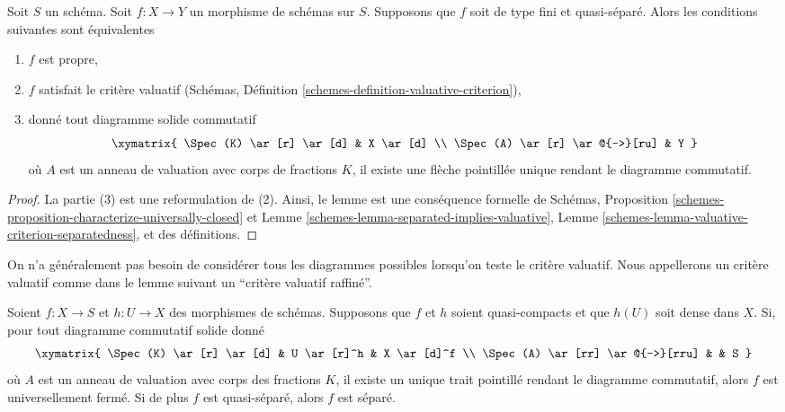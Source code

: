 \begin{lemma}
\label{lemma-characterize-proper}
\begin{reference}
\cite[II Théorème 7.3.8]{EGA}
\end{reference}
Soit $S$ un schéma. Soit $f : X \to Y$ un morphisme de schémas sur $S$.
Supposons que $f$ soit de type fini et quasi-séparé. Alors les
conditions suivantes sont équivalentes
\begin{enumerate}
\item $f$ est propre,
\item $f$ satisfait le critère
valuatif (Schémas, Définition \ref{schemes-definition-valuative-criterion}),
\item donné tout diagramme solide commutatif
$$
\xymatrix{
\Spec(K) \ar[r] \ar[d] & X \ar[d] \\
\Spec(A) \ar[r] \ar@{-->}[ru] & Y
}
$$
où $A$ est un anneau de valuation avec corps de fractions $K$, il existe une
flèche pointillée unique rendant le diagramme commutatif.
\end{enumerate}
\end{lemma}

\begin{proof}
La partie (3) est une reformulation de
(2). Ainsi,
le lemme est une conséquence formelle de Schémas,
Proposition \ref{schemes-proposition-characterize-universally-closed} et Lemme
\ref{schemes-lemma-separated-implies-valuative}, Lemme \ref{schemes-lemma-valuative-criterion-separatedness}, et des
définitions.
\end{proof}

\noindent
On n'a généralement pas besoin de considérer tous les diagrammes possibles
lorsqu'on teste le critère valuatif. Nous appellerons un critère valuatif
comme dans le lemme suivant un ``critère valuatif raffiné''.

\begin{lemma}
\label{lemma-refined-valuative-criterion-universally-closed}
Soient $f : X \to S$ et $h : U \to X$ des morphismes de schémas. Supposons que $f$
et $h$ soient quasi-compacts et que $h(U)$ soit dense dans $X$. Si,
pour tout diagramme commutatif solide donné
$$
\xymatrix{
\Spec(K) \ar[r] \ar[d] & U \ar[r]^h & X \ar[d]^f \\
\Spec(A) \ar[rr] \ar@{-->}[rru] & & S
}
$$
où $A$ est un anneau de valuation avec corps des fractions $K$, il
existe un unique trait pointillé rendant le diagramme commutatif, alors $f$
est universellement fermé. Si de plus $f$ est quasi-séparé, alors $f$
est séparé.
\end{lemma}

